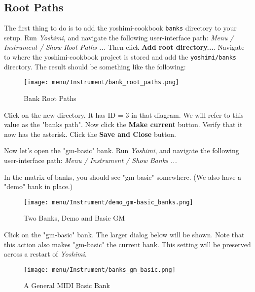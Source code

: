 \subsection{Root Paths}
\label{subsec:cookbook_banks_root_paths}

   The first thing to do is to add the yoshimi-cookbook \texttt{banks}
   directory to your setup.
   Run \textsl{Yoshimi}, and navigate the following user-interface path:
   \textsl{Menu / Instrument / Show Root Paths ...}
   Then click \textbf{Add root directory...}.  Navigate to where the
   yoshimi-cookbook project is stored and add the \texttt{yoshimi/banks}
   directory.  The result should be something like the following:

\begin{figure}[H]
   \centering 
   \texttt{[image: menu/Instrument/bank\_root\_paths.png]}
   \caption{Bank Root Paths}
   \label{fig:cookbook_bank_root_paths}
\end{figure}

   Click on the new directory.
   It has ID = 3 in that diagram.  We will refer to this value as
   the "banks path".
   Now click the \textbf{Make current} button.
   Verify that it now has the asterisk. 
   Click the \textbf{Save and Close} button.

   Now let's open the "gm-basic" bank.
   Run \textsl{Yoshimi}, and navigate the following user-interface path:
   \textsl{Menu / Instrument / Show Banks ...}

   In the matrix of banks, you should see "gm-basic" somewhere.
   (We also have a "demo" bank in place.)

\begin{figure}[H]
   \centering 
   \texttt{[image: menu/Instrument/demo\_gm-basic\_banks.png]}
   \caption{Two Banks, Demo and Basic GM}
   \label{fig:cookbook_bank_demo_gm_basic}
\end{figure}
   
   Click on the "gm-basic" bank.  The larger dialog below will be shown.
   Note that this action also makes "gm-basic" the current bank.
   This setting will be preserved across a restart of \textsl{Yoshimi}.

\begin{figure}[H]
   \centering 
   \texttt{[image: menu/Instrument/banks\_gm\_basic.png]}
   \caption{A General MIDI Basic Bank}
   \label{fig:cookbook_bank_basic_bank}
\end{figure}

